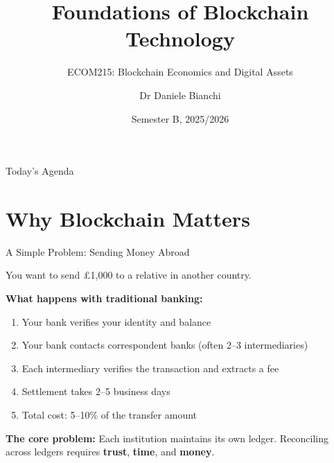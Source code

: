 \documentclass[10pt]{beamer}
\title{Foundations of Blockchain Technology}
\subtitle{ECOM215: Blockchain Economics and Digital Assets}
\author{Dr Daniele Bianchi}
\institute{Queen Mary, University of London}
\date{Semester B, 2025/2026}
\newcommand{\highlight}[1]{\textcolor{AccentOrange}{\textbf{#1}}}
\begin{document}
\AtBeginSection[]{
  \begin{frame}[plain]
    \vfill
    \begin{center}
      {\Large\color{ImperialBlue}\insertsection}
    \end{center}
    \vfill
  \end{frame}
}

\begin{frame}[plain]
  \titlepage
\end{frame}

\begin{frame}{Today's Agenda}
  \tableofcontents
\end{frame}

\section{Why Blockchain Matters}

\begin{frame}{A Simple Problem: Sending Money Abroad}
  \begin{center}
    \Large You want to send £1,000 to a relative in another country.
  \end{center}
  
  \vspace{1.5em}
  \textbf{What happens with traditional banking:}
  \begin{enumerate}
    \item Your bank verifies your identity and balance
    \item Your bank contacts correspondent banks (often 2--3 intermediaries)
    \item Each intermediary verifies the transaction and extracts a fee
    \item Settlement takes 2--5 business days
    \item Total cost: 5--10\% of the transfer amount
  \end{enumerate}
  
  \vspace{1em}
  \textbf{The core problem:} Each institution maintains its own ledger. Reconciling across ledgers requires \highlight{trust}, \highlight{time}, and \highlight{money}.
\end{frame}
\end{document}
